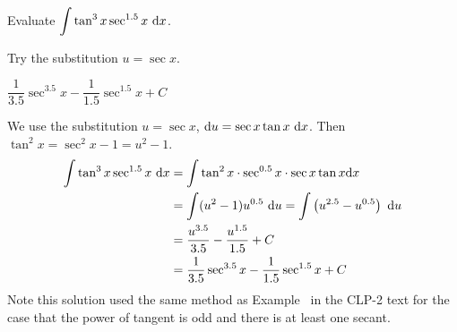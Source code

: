 \begin{question}\label{1.8_oddtanonesec}
Evaluate $\displaystyle\int \tan^3 x \sec^{1.5} x ~\mathrm{d}x$.
\end{question}
\begin{hint}
Try the substitution $u=\sec x$.
\end{hint}
\begin{answer}
$\dfrac{1}{3.5}\sec^{3.5}x - \dfrac{1}{1.5}\sec^{1.5}x+C$
\end{answer}
\begin{solution}
We use the substitution $u=\sec x$, $\mathrm{d}u = \sec x \tan x~\mathrm{d}x$. Then $\tan^2 x = \sec^2 x - 1 = u^2-1$.
\begin{align*}
\int \tan^3 x \sec^{1.5} x ~\mathrm{d}x &= \int \tan^2 x \cdot \sec^{0.5}x \cdot \sec x \tan x \mathrm{d}x\\
&=\int(u^2-1)u^{0.5}~\mathrm{d}u = \int \left(u^{2.5} - u^{0.5}\right)~\mathrm{d}u\\
&=\frac{u^{3.5}}{3.5} - \frac{u^{1.5}}{1.5}+C\\
&=\frac{1}{3.5}\sec^{3.5}x - \frac{1}{1.5}\sec^{1.5}x+C
\end{align*}
Note this solution used the same method as Example~  in the CLP-2 text for the case that the power of tangent is odd and there is at least one secant.
\end{solution}





